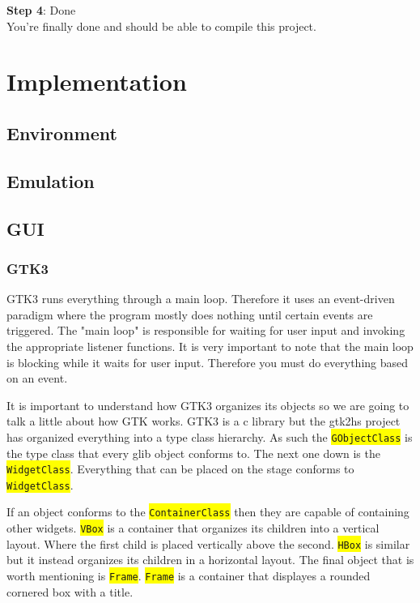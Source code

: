 \documentclass[10point]{article}
\newcommand{\highlight}[1]{\colorbox{yellow}{#1}}
\newcommand{\highlighttt}[1]{\highlight{{\tt#1}}}
\begin{document}
\noindent \textbf{Step 4}: Done \\
You're finally done and should be able to compile this project.

\section{Implementation}
\subsection{Environment}


\subsection{Emulation}


\subsection{GUI}

\subsubsection{GTK3}

GTK3 runs everything through a main loop.  Therefore it uses an event-driven paradigm where the program mostly does nothing until certain events are triggered.  The "main loop" is responsible for waiting for user input and invoking the appropriate listener functions.  It is very important to note that the main loop is blocking while it waits for user input.  Therefore you must do everything based on an event.

It is important to understand how GTK3 organizes its objects so we are going to talk a little about how GTK works.  GTK3 is a c library but the gtk2hs project has organized everything into a type class hierarchy.  As such the \highlighttt{GObjectClass} is the type class that every glib object conforms to.  The next one down is the \highlighttt{WidgetClass}.  Everything that can be placed on the stage conforms to \highlighttt{WidgetClass}.

If an object conforms to the \highlighttt{ContainerClass} then they are capable of containing other widgets.  \highlighttt{VBox} is a container that organizes its children into a vertical layout.  Where the first child is placed vertically above the second.  \highlighttt{HBox} is similar but it instead organizes its children in a horizontal layout.  The final object that is worth mentioning is \highlighttt{Frame}.  \highlighttt{Frame} is a container that displayes a rounded cornered box with a title.
\end{document}
